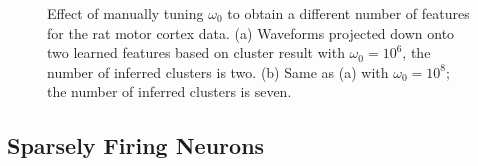 \documentclass[journal]{IEEEtran}
\begin{document}
\begin{figure}[!htbp]
\centering

  \caption{{
{Effect of manually tuning $\omega_0$ to obtain a different number of features for the rat motor cortex data.}
(a) Waveforms projected down onto two learned features based on cluster result with $\omega_0=10^{6}$, the number of inferred clusters is two. (b) Same as (a) with $\omega_0=10^{8}$; the number of inferred clusters is seven.
   }}\label{fig:Tuning_Parameter} \vspace{-20pt}
\end{figure}



\subsection{Sparsely Firing Neurons} \label{sec:sparse}
\end{document}
